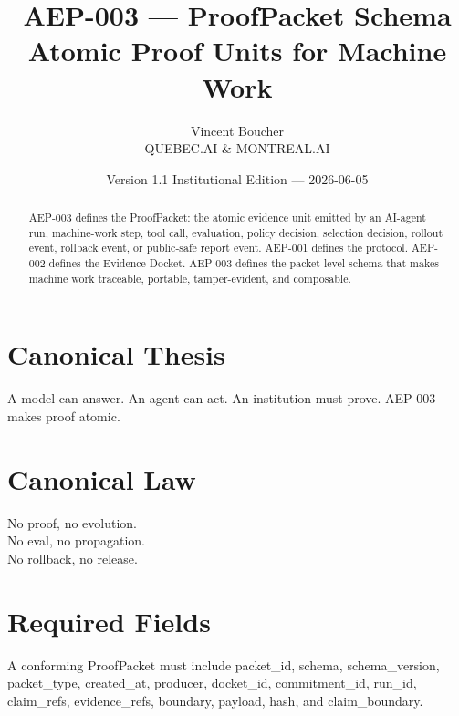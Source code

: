 \documentclass[11pt]{article}
\title{\textbf{AEP-003 --- ProofPacket Schema}\\\large Atomic Proof Units for Machine Work}
\author{Vincent Boucher\\QUEBEC.AI \& MONTREAL.AI}
\date{Version 1.1 Institutional Edition --- 2026-06-05}
\begin{document}
\maketitle

\begin{abstract}
AEP-003 defines the ProofPacket: the atomic evidence unit emitted by an AI-agent run, machine-work step, tool call, evaluation, policy decision, selection decision, rollout event, rollback event, or public-safe report event. AEP-001 defines the protocol. AEP-002 defines the Evidence Docket. AEP-003 defines the packet-level schema that makes machine work traceable, portable, tamper-evident, and composable.
\end{abstract}

\section*{Canonical Thesis}
A model can answer. An agent can act. An institution must prove. AEP-003 makes proof atomic.

\section*{Canonical Law}
No proof, no evolution.\\
No eval, no propagation.\\
No rollback, no release.

\section{Required Fields}
A conforming ProofPacket must include packet\_id, schema, schema\_version, packet\_type, created\_at, producer, docket\_id, commitment\_id, run\_id, claim\_refs, evidence\_refs, boundary, payload, hash, and claim\_boundary.
\end{document}
